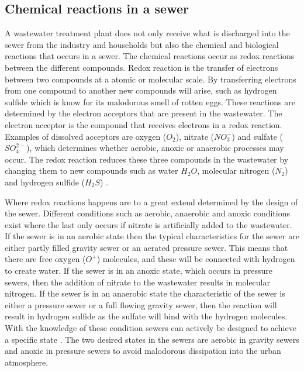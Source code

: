 \subsection{Chemical reactions in a sewer}\label{subse:chemical_reactions_in_a_sewer}
A wastewater treatment plant does not only receive what is discharged into the sewer from the industry and households but also the chemical and biological reactions that occurs in a sewer. The chemical reactions occur as redox reactions between the different compounds. Redox reaction is the transfer of electrons between two compounds at a atomic or molecular scale. By transferring electrons from one compound to another new compounds will arise, such as hydrogen sulfide which is know for its malodorous smell of rotten eggs. These reactions are determined by the electron acceptors that are present in the wastewater. The electron acceptor is the compound that receives electrons in a redox reaction. Examples of dissolved acceptors are oxygen ($O_2$), nitrate ($NO^-_3$) and sulfate ($SO^{2-}_4$), which determines whether aerobic, anoxic or anaerobic processes may occur. The redox reaction reduces these three compounds in the wastewater by changing them to new compounds such as water $H_2O$, molecular nitrogen ($N_2$) and hydrogen sulfide ($H_2S$) \cite{Sewer_processes}. 

Where redox reactions happens are to a great extend determined by the design of the sewer. Different conditions such as aerobic, anaerobic and anoxic conditions exist where the last only occurs if nitrate is artificially added to the wastewater. If the sewer is in an aerobic state then the typical characteristics for the sewer are either partly filled gravity sewer or an aerated pressure sewer. This means that there are free oxygen ($O^+$) molecules, and these will be connected with hydrogen to create water. If the sewer is in an anoxic state, which occurs in pressure sewers, then the addition of nitrate to the wastewater results in molecular nitrogen. If the sewer is in an anaerobic state the characteristic of the sewer is either a pressure sewer or a full flowing gravity sewer, then the reaction will result in hydrogen sulfide as the sulfate will bind with the hydrogen molecules. With the knowledge of these condition sewers can actively be designed to achieve a specific state \cite{Sewer_processes}. The two desired states in the sewers are aerobic in gravity sewers and anoxic in pressure sewers to avoid malodorous dissipation into the urban atmosphere.


